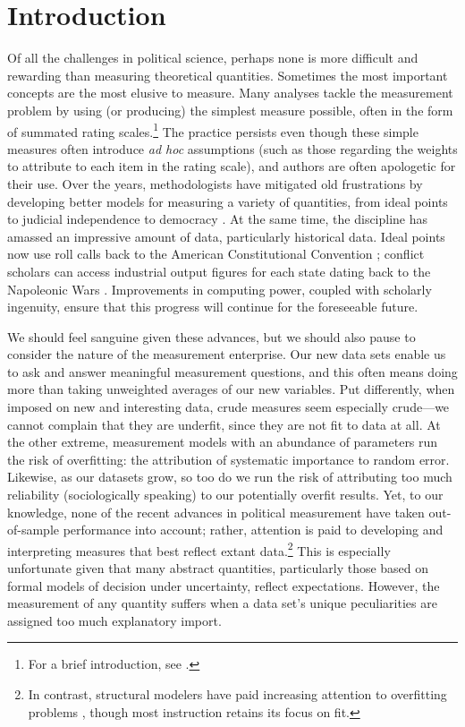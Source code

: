 \section{Introduction}

Of all the challenges in political science, perhaps none is more difficult and rewarding than measuring theoretical quantities.
Sometimes the most important concepts are the most elusive to measure.
Many analyses tackle the measurement problem by using (or producing) the simplest measure possible, often in the form of summated rating scales.\footnote{For a brief introduction, see \citet{spector2006}.}
The practice persists even though these simple measures often introduce \emph{ad hoc} assumptions (such as those regarding the weights to attribute to each item in the rating scale), and authors are often apologetic for their use.
Over the years, methodologists have mitigated old frustrations by developing better models for measuring a variety of quantities, from ideal points \citep{clinton2004} to judicial independence \citep{linzer2014} to democracy \citep{jackman2008}.
At the same time, the discipline has amassed an impressive amount of data, particularly historical data.
Ideal points now use roll calls back to the American Constitutional Convention \citep{heckelman2013}; conflict scholars can access industrial output figures for each state dating back to the Napoleonic Wars \citep{singer1972}.
Improvements in computing power, coupled with scholarly ingenuity, ensure that this progress will continue for the foreseeable future.

We should feel sanguine given these advances, but we should also pause to consider the nature of the measurement enterprise.
Our new data sets enable us to ask and answer meaningful measurement questions, and this often means doing more than taking unweighted averages of our new variables.
Put differently, when imposed on new and interesting data, crude measures seem especially crude---we cannot complain that they are underfit, since they are not fit to data at all.
At the other extreme, measurement models with an abundance of parameters run the risk of overfitting: the attribution of systematic importance to random error.
Likewise, as our datasets grow, so too do we run the risk of attributing too much reliability (sociologically speaking) to our potentially overfit results.
Yet, to our knowledge, none of the recent advances in political measurement have taken out-of-sample performance into account; rather, attention is paid to developing and interpreting measures that best reflect extant data.\footnote{In contrast, structural modelers have paid increasing attention to overfitting problems \citep{pitt2002,preacher2006}, though most instruction retains its focus on fit.}
This is especially unfortunate given that many abstract quantities, particularly those based on formal models of decision under uncertainty, reflect expectations.
However, the measurement of any quantity suffers when a data set's unique peculiarities are assigned too much explanatory import.

